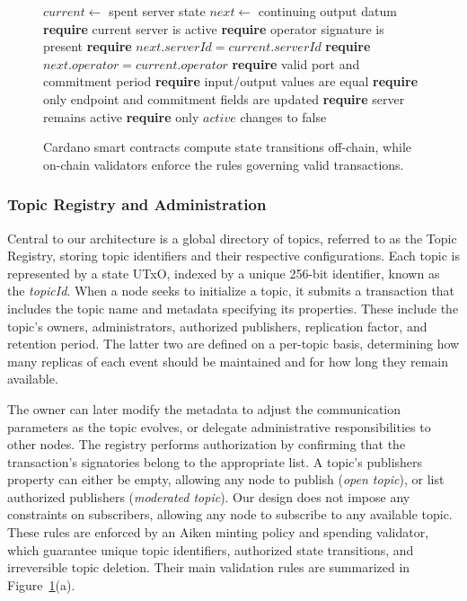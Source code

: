 \begin{figure}[!t]
\begin{minipage}[t]{0.49\textwidth}
        \begin{algorithmic}[1]
            \State $current \gets$ spent server state
            \State $next \gets$ continuing output datum
            \State \textbf{require} current server is active
            \State \textbf{require} operator signature is present
            \State \textbf{require} $next.serverId = current.serverId$
            \State \textbf{require} $next.operator = current.operator$
            \State \textbf{require} valid port and commitment period
            \State \textbf{require} input/output values are equal
                \State \textbf{require} only endpoint and
                \Statex \hspace{2.3em} commitment fields are updated
                \State \textbf{require} server remains active
            \State \textbf{require} only $active$ changes to false
            \EndIf
        \end{algorithmic}
    \end{minipage}

    \caption{Cardano smart contracts compute state transitions off-chain, while on-chain validators enforce the rules governing valid transactions.}
    \label{fig:registry-validators}
\end{figure}

\FloatBarrier

\subsubsection{Topic Registry and Administration}

Central to our architecture is a global directory of topics, referred to as the Topic Registry, storing topic identifiers and their respective configurations.
Each topic is represented by a state UTxO, indexed by a unique 256-bit identifier, known as the \emph{topicId}.
When a node seeks to initialize a topic, it submits a transaction that includes the topic name and metadata specifying its properties.
These include the topic's owners, administrators, authorized publishers, replication factor, and retention period.
The latter two are defined on a per-topic basis, determining how many replicas of each event should be maintained and for how long they remain available.

The owner can later modify the metadata to adjust the communication parameters as the topic evolves, or delegate administrative responsibilities to other nodes.
The registry performs authorization by confirming that the transaction's signatories belong to the appropriate list.
A topic's publishers property can either be empty, allowing any node to publish (\emph{open topic}), or list authorized publishers (\emph{moderated topic}).
Our design does not impose any constraints on subscribers, allowing any node to subscribe to any available topic.
These rules are enforced by an Aiken minting policy and spending validator, which guarantee unique topic identifiers, authorized state transitions, and irreversible topic deletion.
Their main validation rules are summarized in Figure~\ref{fig:registry-validators}(a).


